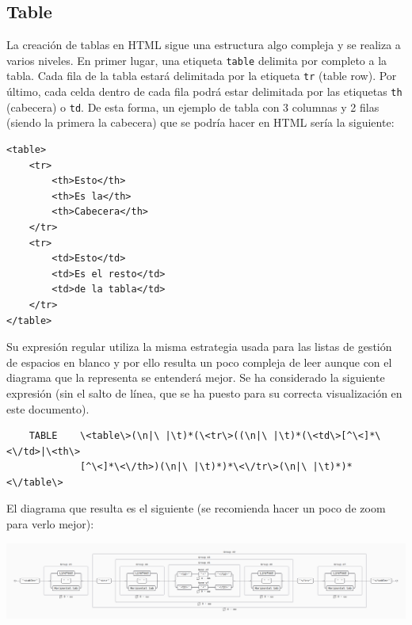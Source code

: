 \documentclass[12pt]{article}
\begin{document}
\subsection{Table}
La creación de tablas en HTML sigue una estructura algo compleja y se realiza a varios niveles. En primer lugar, una etiqueta \verb|table| delimita por completo a la tabla. Cada fila de la tabla estará delimitada por la etiqueta \verb|tr| (table row). Por último, cada celda dentro de cada fila podrá estar delimitada por las etiquetas \verb|th| (cabecera) o \verb|td|. De esta forma, un ejemplo de tabla con 3 columnas y 2 filas (siendo la primera la cabecera) que se podría hacer en HTML sería la siguiente:
\begin{verbatim}
<table>
    <tr>
        <th>Esto</th>
        <th>Es la</th>
        <th>Cabecera</th>
    </tr>
    <tr>
        <td>Esto</td>
        <td>Es el resto</td>
        <td>de la tabla</td>
    </tr>
</table>
\end{verbatim}
Su expresión regular utiliza la misma estrategia usada para las listas de gestión de espacios en blanco y por ello resulta un poco compleja de leer aunque con el diagrama que la representa se entenderá mejor. Se ha considerado la siguiente expresión (sin el salto de línea, que se ha puesto para su correcta visualización en este documento).
\begin{verbatim}
    TABLE    \<table\>(\n|\ |\t)*(\<tr\>((\n|\ |\t)*(\<td\>[^\<]*\<\/td>|\<th\>
             [^\<]*\<\/th>)(\n|\ |\t)*)*\<\/tr\>(\n|\ |\t)*)*<\/table\>
\end{verbatim}
El diagrama que resulta es el siguiente (se recomienda hacer un poco de zoom para verlo mejor):

\begin{center}\includegraphics[width=15cm]{./images/image5.png}\end{center}
\end{document}
